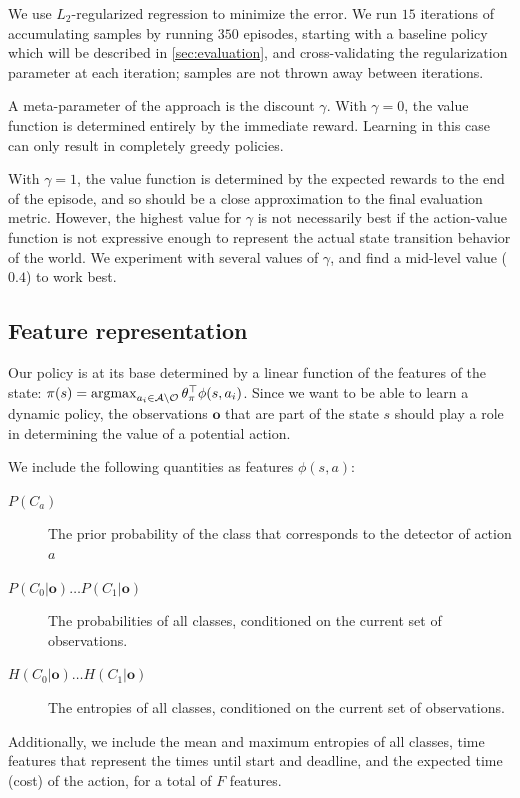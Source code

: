We use $L_2$-regularized regression to minimize the error.
We run $15$ iterations of accumulating samples by running $350$ episodes, starting with a baseline policy which will be described in \autoref{sec:evaluation}, and cross-validating the regularization parameter at each iteration; samples are not thrown away between iterations.

A meta-parameter of the approach is the discount $\gamma$.
With $\gamma=0$, the value function is determined entirely by the immediate reward.
Learning in this case can only result in completely greedy policies.

With $\gamma=1$, the value function is determined by the expected rewards to the end of the episode, and so should be a close approximation to the final evaluation metric.
However, the highest value for $\gamma$ is not necessarily best if the action-value function is not expressive enough to represent the actual state transition behavior of the world.
We experiment with several values of $\gamma$, and find a mid-level value ($0.4$) to work best.

\subsection{Feature representation}
Our policy is at its base determined by a linear function of the features of the state: $\pi(s) = \argmax_{a_i \in \mathcal{A} \setminus \mathcal{O}} \theta_\pi^\top \phi(s,a_i)$.
Since we want to be able to learn a dynamic policy, the observations $\mathbf{o}$ that are part of the state $s$ should play a role in determining the value of a potential action.

We include the following quantities as features $\phi(s,a)$:
\begin{description}
\item[$P(C_a)$] The prior probability of the class that corresponds to the detector of action $a$
\item[$P(C_0|\mathbf{o}) \ldots P(C_1|\mathbf{o})$] The probabilities of all classes, conditioned on the current set of observations.
\item[$H(C_0|\mathbf{o}) \ldots H(C_1|\mathbf{o})$] The entropies of all classes, conditioned on the current set of observations.
\end{description}

Additionally, we include the mean and maximum entropies of all classes, time features that represent the times until start and deadline, and the expected time (cost) of the action, for a total of $F$ features.

